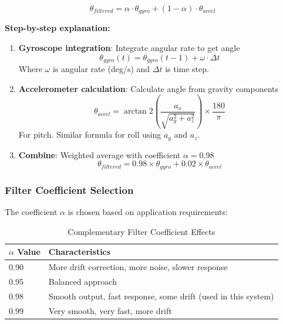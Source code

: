 \documentclass[11pt,a4paper]{article}
\begin{document}
\begin{equation}
\theta_{filtered} = \alpha \cdot \theta_{gyro} + (1 - \alpha) \cdot \theta_{accel}
\end{equation}

\textbf{Step-by-step explanation:}
\begin{enumerate}
    \item \textbf{Gyroscope integration}: Integrate angular rate to get angle
    \begin{equation}
    \theta_{gyro}(t) = \theta_{gyro}(t-1) + \omega \cdot \Delta t
    \end{equation}
    Where $\omega$ is angular rate (deg/s) and $\Delta t$ is time step.
    
    \item \textbf{Accelerometer calculation}: Calculate angle from gravity components
    \begin{equation}
    \theta_{accel} = \arctan2\left(\frac{a_x}{\sqrt{a_y^2 + a_z^2}}\right) \times \frac{180}{\pi}
    \end{equation}
    For pitch. Similar formula for roll using $a_y$ and $a_z$.
    
    \item \textbf{Combine}: Weighted average with coefficient $\alpha = 0.98$
    \begin{equation}
    \theta_{filtered} = 0.98 \times \theta_{gyro} + 0.02 \times \theta_{accel}
    \end{equation}
\end{enumerate}

\subsubsection{Filter Coefficient Selection}
The coefficient $\alpha$ is chosen based on application requirements:

\begin{table}[H]
\centering
\begin{tabular}{@{}ll@{}}
\toprule
\textbf{$\alpha$ Value} & \textbf{Characteristics} \\
\midrule
0.90 & More drift correction, more noise, slower response \\
0.95 & Balanced approach \\
0.98 & Smooth output, fast response, some drift (used in this system) \\
0.99 & Very smooth, very fast, more drift \\
\bottomrule
\end{tabular}
\caption{Complementary Filter Coefficient Effects}
\end{table}
\end{document}
